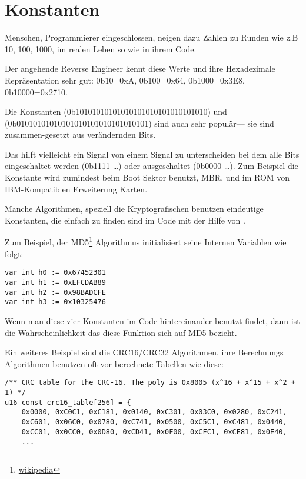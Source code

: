 \section{Konstanten}

Menschen, Programmierer eingeschlossen, neigen dazu Zahlen zu Runden wie z.B 10, 100, 1000,
im realen Leben so wie in ihrem Code.

Der angehende Reverse Engineer kennt diese Werte und ihre Hexadezimale Repr\"asentation sehr gut:
0b10=0xA, 0b100=0x64, 0b1000=0x3E8, 0b10000=0x2710.

Die Konstanten  (0b10101010101010101010101010101010) und 
 (0b01010101010101010101010101010101) sind auch sehr popul\"ar---
sie sind zusammen-gesetzt aus ver\"andernden Bits. %

Das hilft vielleicht ein Signal von einem Signal zu unterscheiden bei dem alle Bits eingeschaltet werden  (0b1111 \dots) oder ausgeschaltet (0b0000 \dots).
Zum Beispiel die  Konstante wird
zumindest beim Boot Sektor benutzt, \ac{MBR},
und im \ac{ROM} von IBM-Kompatiblen Erweiterung Karten.

Manche Algorithmen, speziell die Kryptografischen benutzen eindeutige Konstanten, die einfach zu finden 
sind im Code mit der Hilfe von \IDA.

\newcommand{\URLMD}{http://go.yurichev.com/17111}

Zum Beispiel, der MD5\footnote{\href{\URLMD}{wikipedia}} Algorithmus initialisiert seine Internen Variablen wie folgt:


\begin{verbatim}
var int h0 := 0x67452301
var int h1 := 0xEFCDAB89
var int h2 := 0x98BADCFE
var int h3 := 0x10325476
\end{verbatim}

Wenn man diese vier Konstanten im Code hintereinander benutzt findet, dann ist die Wahrscheinlichkeit das diese Funktion 
sich auf MD5 bezieht.

\par Ein weiteres Beispiel sind die CRC16/CRC32 Algorithmen,
ihre Berechnungs Algorithmen benutzen oft vor-berechnete Tabellen wie diese:

\begin{lstlisting}[caption=linux/lib/crc16.c,style=customc]
/** CRC table for the CRC-16. The poly is 0x8005 (x^16 + x^15 + x^2 + 1) */
u16 const crc16_table[256] = {
	0x0000, 0xC0C1, 0xC181, 0x0140, 0xC301, 0x03C0, 0x0280, 0xC241,
	0xC601, 0x06C0, 0x0780, 0xC741, 0x0500, 0xC5C1, 0xC481, 0x0440,
	0xCC01, 0x0CC0, 0x0D80, 0xCD41, 0x0F00, 0xCFC1, 0xCE81, 0x0E40,
	...
\end{lstlisting}

